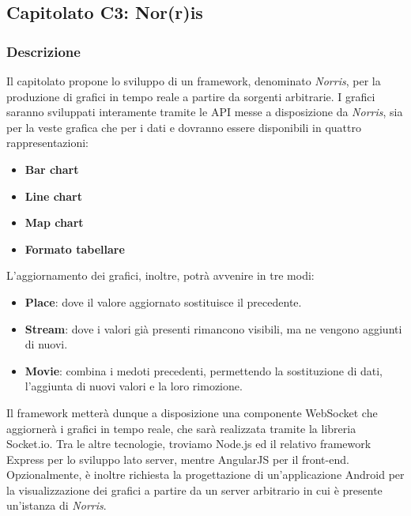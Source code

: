 
\subsection{Capitolato C3: Nor(r)is}

\subsubsection{Descrizione}
Il capitolato propone lo sviluppo di un framework, denominato \emph{Norris}, per la produzione di grafici in tempo reale a partire da sorgenti arbitrarie. I grafici saranno sviluppati interamente tramite le API messe a disposizione da \emph{Norris}, sia per la veste grafica che per i dati e dovranno essere disponibili in quattro rappresentazioni:
\begin{itemize}
\item \textbf{Bar chart}
\item \textbf{Line chart}
\item \textbf{Map chart}
\item \textbf{Formato tabellare}
\end{itemize}
L'aggiornamento dei grafici, inoltre, potrà avvenire in tre modi: 
\begin{itemize}
\item \textbf{Place}: dove il valore aggiornato sostituisce il precedente.
\item \textbf{Stream}: dove i valori già presenti rimancono visibili, ma ne vengono aggiunti di nuovi.
\item \textbf{Movie}: combina i medoti precedenti, permettendo la sostituzione di dati, l'aggiunta di nuovi valori e la loro rimozione.
\end{itemize}
Il framework metterà dunque a disposizione una componente WebSocket che aggiornerà i grafici in tempo reale, che sarà realizzata tramite la libreria Socket.io. Tra le altre tecnologie, troviamo Node.js ed il relativo framework Express per lo sviluppo lato server, mentre AngularJS per il front-end. Opzionalmente, è inoltre richiesta la progettazione di un'applicazione Android per la visualizzazione dei grafici a partire da un server arbitrario in cui è presente un'istanza di \emph{Norris}.

